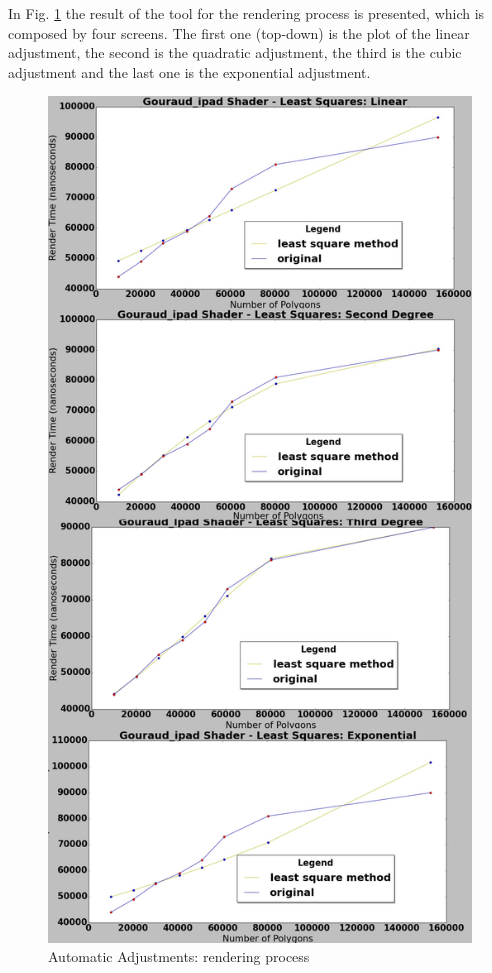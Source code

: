 \documentclass[10pt, conference, compsocconf]{IEEEtran}
\begin{document}
{ In Fig. \ref{tool_result} the result of the tool for
the rendering process is presented, which is composed by four screens. 
The first one (top-down) is the plot of the linear adjustment, the second 
is the quadratic adjustment, the third is  the cubic  
adjustment and the last one is the exponential adjustment. 

	\begin{figure}[!t]
	\centering
		\includegraphics[keepaspectratio=true,scale=0.23]{figures/ios_minquad_render.jpg}
	\caption{Automatic Adjustments: rendering process}
	\label{tool_result}
	\end{figure}

}
\end{document}
